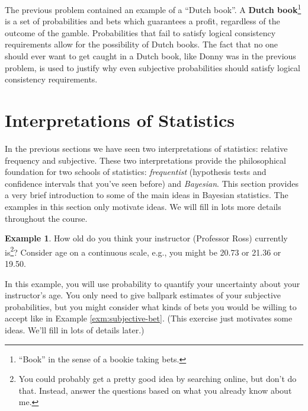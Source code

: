 \documentclass[
]{book}
\theoremstyle{definition}
\theoremstyle{definition}
\newtheorem{example}{Example}[chapter]
\theoremstyle{definition}
\theoremstyle{remark}
\begin{document}
The previous problem contained an example of a ``Dutch book''. A \textbf{Dutch book}\footnote{``Book'' in the sense of a bookie taking bets.} is a set of probabilities and bets which guarantees a profit, regardless of the outcome of the gamble. Probabilities that fail to satisfy logical consistency requirements allow for the possibility of Dutch books. The fact that no one should ever want to get caught in a Dutch book, like Donny was in the previous problem, is used to justify why even subjective probabilities should satisfy logical consistency requirements.

\hypertarget{interpretations-of-statistics}{%
\section{Interpretations of Statistics}\label{interpretations-of-statistics}}

In the previous sections we have seen two interpretations of statistics: relative frequency and subjective. These two interpretations provide the philosophical foundation for two schools of statistics: \emph{frequentist} (hypothesis tests and confidence intervals that you've seen before) and \emph{Bayesian}. This section provides a very brief introduction to some of the main ideas in Bayesian statistics. The examples in this section only motivate ideas. We will fill in lots more details throughout the course.

\begin{example}
\protect\hypertarget{exm:instructor-age}{}{\label{exm:instructor-age} }
How old do you think your instructor (Professor Ross) currently is\footnote{You could probably get a pretty good idea by searching online, but don't do that. Instead, answer the questions based on what you already know about me.}? Consider age on a
continuous scale, e.g., you might be 20.73 or 21.36 or 19.50.

In this example, you will use probability to quantify your uncertainty about your instructor's age. You only need to give ballpark estimates of your subjective probabilities, but you might consider what kinds of bets you would be willing to accept like in Example \ref{exm:subjective-bet}. (This exercise just motivates some ideas. We'll fill in lots of details later.)
\end{example}
\end{document}
